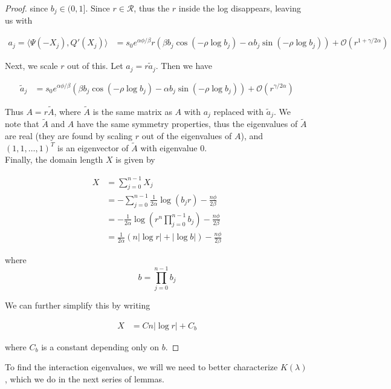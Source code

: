 \documentclass[thesis.tex]{subfiles}
\begin{document}
\begin{lemma}
\begin{proof}
since $b_j \in (0, 1]$. Since $r \in \mathcal{R}$, thus the $r$ inside the log disappears, leaving us with

\begin{align*}
a_j = \langle \Psi(-X_j), Q'(X_j) \rangle 
&= s_0 e^{\alpha \phi/\beta} r \left( \beta b_j \cos\left( -\rho \log b_j \right) - \alpha b_j \sin \left( -\rho \log b_j  \right) \right) + \mathcal{O}(r^{1+\gamma/2\alpha})
\end{align*}

Next, we scale $r$ out of this. Let $a_j = r \tilde{a}_j$. Then we have

\begin{align*}
\tilde{a}_j 
&= s_0 e^{\alpha \phi/\beta} \left( \beta b_j \cos\left( -\rho \log b_j \right) - \alpha b_j \sin \left( -\rho \log b_j  \right) \right) + \mathcal{O}(r^{\gamma/2\alpha})
\end{align*}

Thus $A = r \tilde{A}$, where $\tilde{A}$ is the same matrix as $A$ with $a_j$ replaced with $\tilde{a}_j$. We note that $\tilde{A}$ and $A$ have the same symmetry properties, thus the eigenvalues of $\tilde{A}$ are real (they are found by scaling $r$ out of the eigenvalues of $A$), and $(1,1,\dots,1)^T$ is an eigenvector of $\tilde{A}$ with eigenvalue 0. \\

Finally, the domain length $X$ is given by

\begin{align*}
X &= \sum_{j=0}^{n-1} X_j \\
&= -\sum_{j=0}^{n-1} \frac{1}{2\alpha}\log(b_j r) - \frac{n \phi}{2 \beta}\\
&= -\frac{1}{2\alpha} \log\left( r^n \prod_{j=0}^{n-1} b_j \right) - \frac{n \phi}{2 \beta} \\
&= \frac{1}{2\alpha} (n |\log r| + |\log b| ) - \frac{n \phi}{2 \beta}
\end{align*}

where 
\[
b = \prod_{j=0}^{n-1} b_j
\]

We can further simplify this by writing

\begin{align*}
X &= C n |\log r| + C_b
\end{align*}

where $C_b$ is a constant depending only on $b$.

\end{proof}
\end{lemma}

To find the interaction eigenvalues, we will we need to better characterize $K(\lambda)$, which we do in the next series of lemmas.
\end{document}
